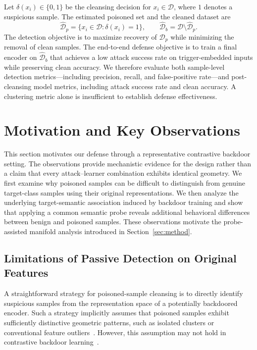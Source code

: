 \documentclass[10pt,journal]{IEEEtran}
\begin{document}
Let $\delta(x_i)\in\{0,1\}$ be the cleansing decision for $x_i\in\mathcal{D}$, where $1$ denotes a suspicious sample. The estimated poisoned set and the cleaned dataset are
\begin{equation}
    \widehat{\mathcal{D}}_{p}=\{x_i\in\mathcal{D}:\delta(x_i)=1\},\qquad
    \widehat{\mathcal{D}}_{b}=\mathcal{D}\setminus\widehat{\mathcal{D}}_{p}.
    \label{eq:cleansingsets}
\end{equation}
The detection objective is to maximize recovery of $\mathcal{D}_{p}$ while minimizing the removal of clean samples. The end-to-end defense objective is to train a final encoder on $\widehat{\mathcal{D}}_{b}$ that achieves a low attack success rate on trigger-embedded inputs while preserving clean accuracy. We therefore evaluate both sample-level detection metrics---including precision, recall, and false-positive rate---and post-cleansing model metrics, including attack success rate and clean accuracy. A clustering metric alone is insufficient to establish defense effectiveness.
\section{Motivation and Key Observations}
\label{sec:motivation}

This section motivates our defense through a representative
contrastive backdoor setting. The observations provide mechanistic
evidence for the design rather than a claim that every attack--learner
combination exhibits identical geometry. We first examine why poisoned samples
can be difficult to distinguish from genuine target-class samples
using their original representations. We then analyze the underlying
target-semantic association induced by backdoor training and show
that applying a common semantic probe reveals additional behavioral
differences between benign and poisoned samples. These observations
motivate the probe-assisted manifold analysis introduced in
Section~\ref{sec:method}.


\subsection{Limitations of Passive Detection on Original Features}
\label{sec:original_feature}

A straightforward strategy for poisoned-sample cleansing is to
directly identify suspicious samples from the representation space
of a potentially backdoored encoder. Such a strategy implicitly
assumes that poisoned samples exhibit sufficiently distinctive
geometric patterns, such as isolated clusters or conventional
feature outliers~\cite{Chen2018ActivationClustering,Tran2018Spectral,Hayase2021SPECTRE}.
However, this assumption may not hold in contrastive backdoor
learning~\cite{Li2024Difficulty}.
\end{document}
